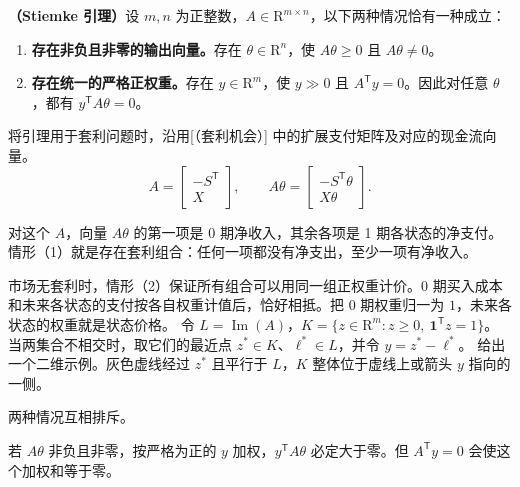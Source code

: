 \begin{tcolorbox}[knowledge]
\textbf{（Stiemke 引理）}设 $m,n$ 为正整数，$A\in\mathrm R^{m\times n}$，以下两种情况恰有一种成立：
\begin{enumerate}
 \item \textbf{存在非负且非零的输出向量。}存在 $\theta\in\mathrm R^n$，使 $A\theta\ge0$ 且 $A\theta\ne0$。
 \item \textbf{存在统一的严格正权重。}存在 $y\in\mathrm R^m$，使 $y\gg0$ 且 $A^{\mathsf T}y=0$。因此对任意 $\theta$，都有 $y^{\mathsf T}A\theta=0$。
\end{enumerate}

将引理用于套利问题时，沿用[（套利机会）] 中的扩展支付矩阵及对应的现金流向量。
\[
 A=\begin{bmatrix}-S^{\mathsf T}\\ X\end{bmatrix},
 \qquad
 A\theta=\begin{bmatrix}-S^{\mathsf T}\theta\\ X\theta\end{bmatrix}.
\]

对这个 $A$，向量 $A\theta$ 的第一项是 0 期净收入，其余各项是 1 期各状态的净支付。情形（1）就是存在套利组合：任何一项都没有净支出，至少一项有净收入。

市场无套利时，情形（2）保证所有组合可以用同一组正权重计价。0 期买入成本和未来各状态的支付按各自权重计值后，恰好相抵。把 0 期权重归一为 $1$，未来各状态的权重就是状态价格。
\tcbline
令 $L=\operatorname{Im}(A)$，$K=\{z\in\mathrm R^m:z\ge0,\ \mathbf1^{\mathsf T}z=1\}$。当两集合不相交时，取它们的最近点 $z^*\in K$、$\ell^*\in L$，并令 $y=z^*-\ell^*$。 给出一个二维示例。灰色虚线经过 $z^*$ 且平行于 $L$，$K$ 整体位于虚线上或箭头 $y$ 指向的一侧。
\begin{center}
\begin{minipage}{\linewidth}
%
\centering
\usebox{\WJStiemkeFigure}%
\end{minipage}
\end{center}

\begin{solution}[label-content={证明},blank-type=none]
两种情况互相排斥。

若 $A\theta$ 非负且非零，按严格为正的 $y$ 加权，$y^{\mathsf T}A\theta$ 必定大于零。但 $A^{\mathsf T}y=0$ 会使这个加权和等于零。


\end{solution}
\end{tcolorbox}
